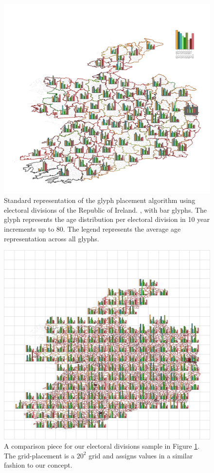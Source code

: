 \begin{figure} \centering
\includegraphics[width=1\textwidth]{images/ch5/irelandgridAFull.png}
\caption{Standard representation of the glyph placement algorithm using electoral divisions of the Republic of Ireland. \cite{electoralDivisions}, with bar glyphs. The glyph represents the age distribution per electoral division in 10 year increments up to 80. The legend represents the average age representation across all glyphs. } \label{fig:sample3}
\end{figure}
\begin{figure} \centering
\includegraphics[width=1\textwidth]{images/ch5/irelandgridBFull.png}
\caption{A comparison piece for our electoral divisions sample in Figure \ref{fig:sample3}. The grid-placement is a $20^2$ grid and assigns values in a similar fashion to our concept.}
\end{figure}
